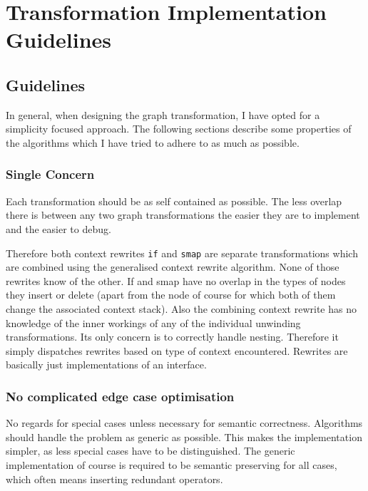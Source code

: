 \chapter{Transformation Implementation Guidelines}


\section{Guidelines}

In general, when designing the \yauhau{} graph transformation, I have opted for a simplicity focused approach.
The following sections describe some properties of the algorithms which I have tried to adhere to as much as possible.

\subsection{Single Concern}

Each transformation should be as self contained as possible.
The less overlap there is between any two graph transformations the easier they are to implement and the easier to debug.

Therefore both context rewrites \texttt{if} and \texttt{smap} are separate transformations which are combined using the generalised context rewrite algorithm.
None of those rewrites know of the other.
If and smap have no overlap in the types of nodes they insert or delete (apart from the \fetch{} node of course for which both of them change the associated context stack).
Also the combining context rewrite has no knowledge of the inner workings of any of the individual unwinding transformations.
Its only concern is to correctly handle nesting.
Therefore it simply dispatches rewrites based on type of context encountered.
Rewrites are basically just implementations of an interface.

\subsection{No complicated edge case optimisation}

No regards for special cases unless necessary for semantic correctness.
Algorithms should handle the problem as generic as possible.
This makes the implementation simpler, as less special cases have to be distinguished.
The generic implementation of course is required to be semantic preserving for all cases, which often means inserting redundant operators.

